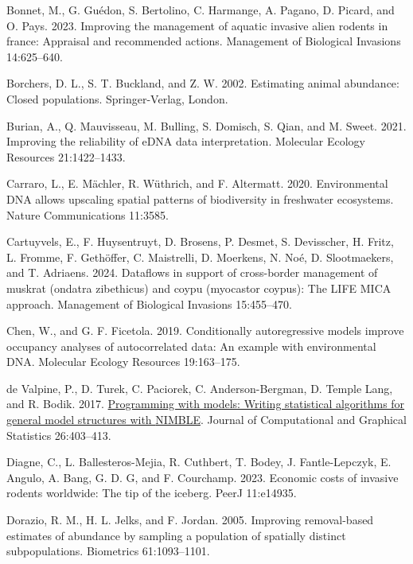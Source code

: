 \documentclass[
  11pt,
  a4paper,
]{article}
\newlength{\cslhangindent}
\newenvironment{CSLReferences}[2] %
 {\begin{list}{}{%
  \setlength{\itemindent}{0pt}
  \setlength{\leftmargin}{0pt}
  \setlength{\parsep}{0pt}
  \ifodd #1
   \setlength{\leftmargin}{\cslhangindent}
   \setlength{\itemindent}{-1\cslhangindent}
  \fi
  \setlength{\itemsep}{#2\baselineskip}}}
 {\end{list}}
\begin{document}
\label{refs}
\begin{CSLReferences}{1}{0}
Bonnet, M., G. Guédon, S. Bertolino, C. Harmange, A. Pagano, D. Picard, and O. Pays. 2023. Improving the management of aquatic invasive alien rodents in france: Appraisal and recommended actions. Management of Biological Invasions 14:625--640.

Borchers, D. L., S. T. Buckland, and Z. W. 2002. Estimating animal abundance: Closed populations. Springer-Verlag, London.

Burian, A., Q. Mauvisseau, M. Bulling, S. Domisch, S. Qian, and M. Sweet. 2021. Improving the reliability of eDNA data interpretation. Molecular Ecology Resources 21:1422--1433.

Carraro, L., E. Mächler, R. Wüthrich, and F. Altermatt. 2020. Environmental DNA allows upscaling spatial patterns of biodiversity in freshwater ecosystems. Nature Communications 11:3585.

Cartuyvels, E., F. Huysentruyt, D. Brosens, P. Desmet, S. Devisscher, H. Fritz, L. Fromme, F. Gethöffer, C. Maistrelli, D. Moerkens, N. Noé, D. Slootmaekers, and T. Adriaens. 2024. Dataflows in support of cross-border management of muskrat (ondatra zibethicus) and coypu (myocastor coypus): The LIFE MICA approach. Management of Biological Invasions 15:455--470.

Chen, W., and G. F. Ficetola. 2019. Conditionally autoregressive models improve occupancy analyses of autocorrelated data: An example with environmental DNA. Molecular Ecology Resources 19:163--175.

de Valpine, P., D. Turek, C. Paciorek, C. Anderson-Bergman, D. Temple Lang, and R. Bodik. 2017. \href{https://doi.org/10.1080/10618600.2016.1172487}{Programming with models: Writing statistical algorithms for general model structures with {NIMBLE}}. Journal of Computational and Graphical Statistics 26:403--413.

Diagne, C., L. Ballesteros-Mejia, R. Cuthbert, T. Bodey, J. Fantle-Lepczyk, E. Angulo, A. Bang, G. D. G, and F. Courchamp. 2023. Economic costs of invasive rodents worldwide: The tip of the iceberg. PeerJ 11:e14935.

Dorazio, R. M., H. L. Jelks, and F. Jordan. 2005. Improving removal-based estimates of abundance by sampling a population of spatially distinct subpopulations. Biometrics 61:1093--1101.


\end{CSLReferences}
\end{document}

